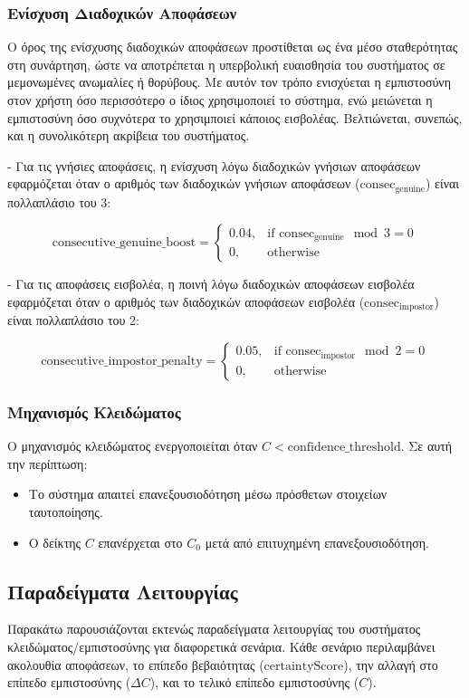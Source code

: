 \subsubsection{Ενίσχυση Διαδοχικών Αποφάσεων}
Ο όρος της ενίσχυσης διαδοχικών αποφάσεων προστίθεται ως ένα μέσο σταθερότητας στη συνάρτηση, ώστε να αποτρέπεται η υπερβολική ευαισθησία του συστήματος σε μεμονωμένες ανωμαλίες ή θορύβους. Με αυτόν τον τρόπο ενισχύεται η εμπιστοσύνη στον χρήστη όσο περισσότερο ο ίδιος χρησιμοποιεί το σύστημα, ενώ μειώνεται η εμπιστοσύνη όσο συχνότερα το χρησιμποιεί κάποιος εισβολέας. Βελτιώνεται, συνεπώς, και η συνολικότερη ακρίβεια του συστήματος.


- Για τις γνήσιες αποφάσεις, η ενίσχυση λόγω διαδοχικών γνήσιων αποφάσεων εφαρμόζεται όταν ο αριθμός των διαδοχικών γνήσιων αποφάσεων ($\text{consec}_{\text{genuine}}$) είναι πολλαπλάσιο του 3:

\[
\text{consecutive\_genuine\_boost} = 
\begin{cases} 
0.04, & \text{if } \text{consec}_{\text{genuine}} \mod 3 = 0 \\
0, & \text{otherwise}
\end{cases}
\]

- Για τις αποφάσεις εισβολέα, η ποινή λόγω διαδοχικών αποφάσεων εισβολέα εφαρμόζεται όταν ο αριθμός των διαδοχικών αποφάσεων εισβολέα ($\text{consec}_{\text{impostor}}$) είναι πολλαπλάσιο του 2:

\[
\text{consecutive\_impostor\_penalty} = 
\begin{cases} 
0.05, & \text{if } \text{consec}_{\text{impostor}} \mod 2 = 0 \\
0, & \text{otherwise}
\end{cases}
\]

\subsubsection{Μηχανισμός Κλειδώματος}
Ο μηχανισμός κλειδώματος ενεργοποιείται όταν $C < \text{confidence\_threshold}$. Σε αυτή την περίπτωση:

\begin{itemize}
    \item Το σύστημα απαιτεί επανεξουσιοδότηση μέσω πρόσθετων στοιχείων ταυτοποίησης.
    \item Ο δείκτης $C$ επανέρχεται στο $C_0$ μετά από επιτυχημένη επανεξουσιοδότηση.
\end{itemize}

\subsection{Παραδείγματα Λειτουργίας}
Παρακάτω παρουσιάζονται εκτενώς παραδείγματα λειτουργίας του συστήματος κλειδώματος/εμπιστοσύνης για διαφορετικά σενάρια. Κάθε σενάριο περιλαμβάνει ακολουθία αποφάσεων, το επίπεδο βεβαιότητας ($\text{certaintyScore}$), την αλλαγή στο επίπεδο εμπιστοσύνης ($\Delta C$), και το τελικό επίπεδο εμπιστοσύνης ($C$).

